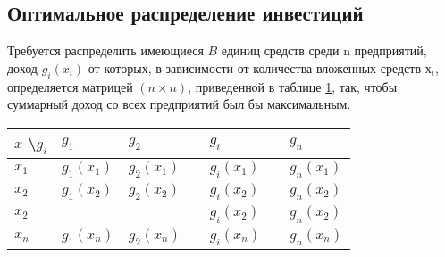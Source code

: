 \subsection{Оптимальное распределение инвестиций}

Требуется распределить имеющиеся $B$ единиц средств среди n предприятий, доход $g_i(x_i)$ от которых, в зависимости от количества вложенных средств $х_i$, определяется матрицей $(n \times n)$, приведенной в таблице \ref{table:opt:initial:data}, так, чтобы суммарный доход со всех предприятий был бы максимальным.

\begin{table}[!ht]
  \label{table:opt:initial:data}
  \centering
  \begin{tabularx}{\linewidth}{ |X|X|X|X|X|X|X| }
	\hline
	$x$ \textbackslash $g_i$ & $g_1$ & $g_2$ & \textellipsis & $g_i$ & \textellipsis & $g_n$ \\
	\hline
	$x_1$ & $g_1(x_1)$ & $g_2(x_1)$ & \textellipsis & $g_i(x_1)$ & \textellipsis & $g_n(x_1)$ \\
	\hline
	$x_2$ & $g_1(x_2)$ & $g_2(x_2)$ & \textellipsis & $g_i(x_2)$ & \textellipsis & $g_n(x_2)$ \\
	\hline
	$x_2$ & \textellipsis & \textellipsis & \textellipsis & $g_i(x_2)$ & \textellipsis & $g_n(x_2)$ \\
	\hline
	$x_n$ & $g_1(x_n)$ & $g_2(x_n)$ & \textellipsis & $g_i(x_n)$ & \textellipsis & $g_n(x_n)$ \\
	\hline
  \end{tabularx}
\end{table}